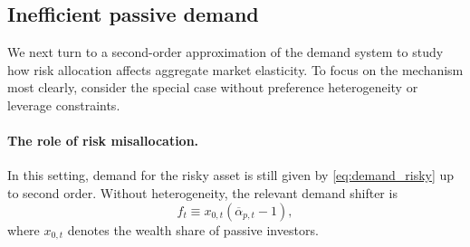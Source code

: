 


\subsection{Inefficient passive demand}

We next turn to a second-order approximation of the demand system to study how risk allocation affects aggregate market elasticity. To focus on the mechanism most clearly, consider the special case without preference heterogeneity or leverage constraints.  

\paragraph{The role of risk misallocation.}  
In this setting, demand for the risky asset is still given by \eqref{eq:demand_risky} up to second order. Without heterogeneity, the relevant demand shifter is  
\[
    f_t \equiv x_{0,t}\left(\overline{\alpha}_{p,t}-1\right),
\]
where $x_{0,t}$ denotes the wealth share of passive investors.  

